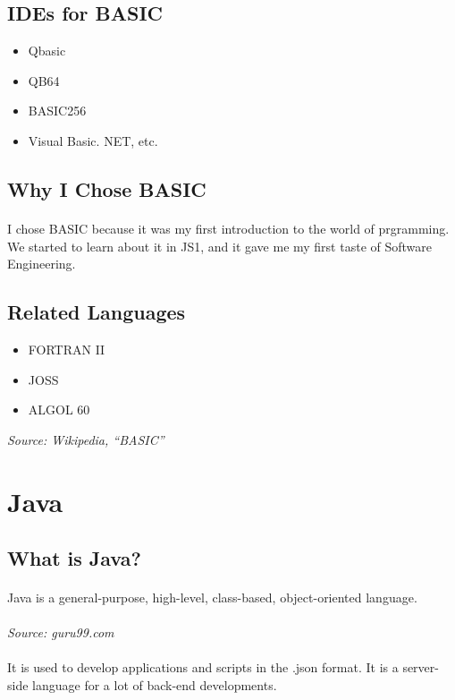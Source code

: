 \documentclass{article}
\begin{document}
	\subsection{IDEs for BASIC}
	\begin{itemize}
		\item Qbasic
		\item QB64
		\item BASIC256
		\item Visual Basic. NET, etc.
	\end{itemize}
	\subsection{Why I Chose BASIC}
	\paragraph{}I chose BASIC because it was my first introduction to the world of prgramming.
	We started to learn about it in JS1, and it gave me my first taste of Software Engineering.
	\subsection{Related Languages}
	\begin{itemize}
	\item FORTRAN II
	\item JOSS
	\item ALGOL 60
	\end{itemize}
	\textit{Source: Wikipedia, “BASIC”}
	
	
	\section{Java}
	\subsection{What is Java?}
	\paragraph{}Java is a general-purpose, high-level, class-based, object-oriented language.
	\paragraph{}\textit{Source: guru99.com}
	\paragraph{}It is used to develop applications and scripts in the .json format.
	It is a server-side language for a lot of back-end developments.
\end{document}
